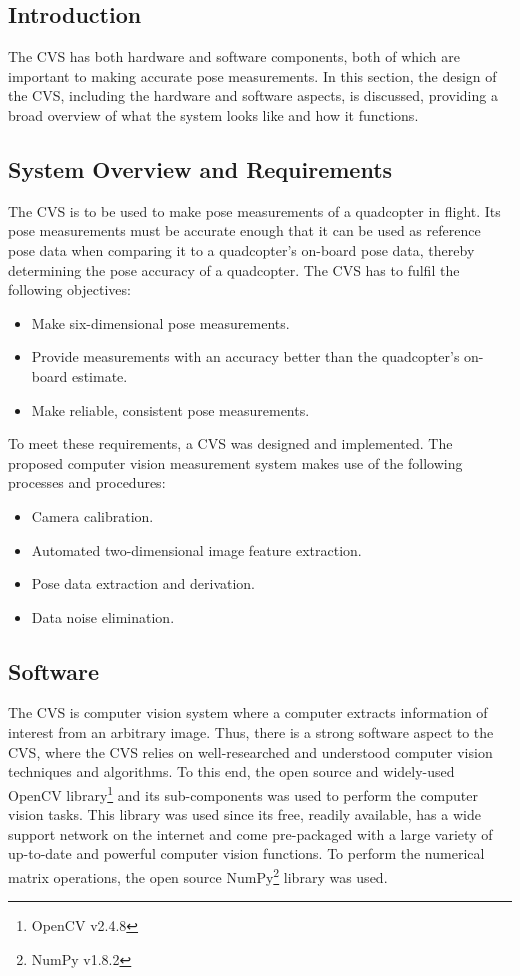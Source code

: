 \subsection{Introduction}

The CVS has both hardware and software components, both of which are important to making accurate pose measurements. In this section, the design of the CVS, including the hardware and software aspects, is discussed, providing a broad overview of what the system looks like and how it functions. 

\subsection{System Overview and Requirements}

The CVS is to be used to make pose measurements of a quadcopter in flight. Its pose measurements must be accurate enough that it can be used as reference pose data when comparing it to a quadcopter's on-board pose data, thereby determining the pose accuracy of a quadcopter. The CVS has to fulfil the following objectives:

\begin{itemize}
  \item Make six-dimensional pose measurements.
  \item Provide measurements with an accuracy better than the quadcopter's on-board estimate.
  \item Make reliable, consistent pose measurements.
\end{itemize}

To meet these requirements, a CVS was designed and implemented. The proposed computer vision measurement system makes use of the following processes and procedures: 

\begin{itemize}
  \item Camera calibration.
  \item Automated two-dimensional image feature extraction.
  \item Pose data extraction and derivation.
  \item Data noise elimination. 
\end{itemize}

\subsection{Software}
\label{sec:cv-sys-software}

The CVS is computer vision system where a computer extracts information of interest from an arbitrary image. Thus, there is a strong software aspect to the CVS, where the CVS relies on well-researched and understood computer vision techniques and algorithms. To this end, the open source and widely-used OpenCV library\footnote{OpenCV v2.4.8} and its sub-components was used to perform the computer vision tasks. This library was used since its free, readily available, has a wide support network on the internet and come pre-packaged with a large variety of up-to-date and powerful computer vision functions. To perform the numerical matrix operations, the open source NumPy\footnote{NumPy v1.8.2} library was used. 

